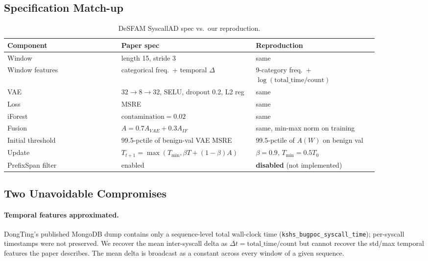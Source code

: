 \documentclass[conference,10pt]{IEEEtran}
\begin{document}
\subsection{Specification Match-up}

\begin{table}[t]
\centering
\caption{DeSFAM SyscallAD spec vs.\ our reproduction.}
\label{tab:repro_spec}
\begin{tabular}{p{0.28\linewidth}p{0.3\linewidth}p{0.3\linewidth}}
\toprule
\textbf{Component} & \textbf{Paper spec} & \textbf{Reproduction} \\
\midrule
Window & length 15, stride 3 & same \\
Window features & categorical freq.\ + temporal $\Delta$ & 9-category freq.\
                                                            + $\log(\text{total\_time}/\text{count})$ \\
VAE & $32{\to}8{\to}32$, SELU, dropout 0.2, L2 reg & same \\
Loss & MSRE & same \\
iForest & $\text{contamination}=0.02$ & same \\
Fusion & $A = 0.7 A_{VAE} + 0.3 A_{IF}$ & same, min-max norm on training \\
Initial threshold & 99.5-pctile of benign-val VAE MSRE & 99.5-pctile of
                                                         $A(W)$ on benign val \\
Update & $T_{t+1} = \max(T_{\min}, \beta T + (1-\beta)A)$ & $\beta=0.9$,
                                                            $T_{\min}=0.5 T_0$ \\
PrefixSpan filter & enabled & \textbf{disabled} (not implemented) \\
\bottomrule
\end{tabular}
\end{table}

\subsection{Two Unavoidable Compromises}

\paragraph{Temporal features approximated.}
DongTing's published MongoDB dump contains only a sequence-level total
wall-clock time (\texttt{kshs\_bugpoc\_syscall\_time}); per-syscall
timestamps were not preserved. We recover the mean inter-syscall delta as
$\overline{\Delta t} = \text{total\_time} / \text{count}$ but cannot
recover the std/max temporal features the paper describes. The mean delta
is broadcast as a constant across every window of a given sequence.
\end{document}
